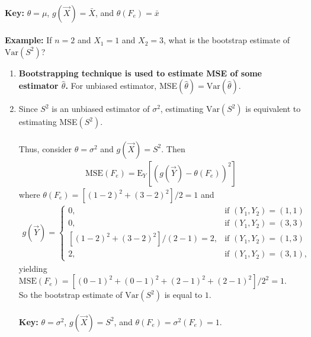 \documentclass[12pt]{article}
\begin{document}
\noindent\\
{\bf Key:} $\theta=\mu$,  $g({\vec X})={\bar X}$, and
$\theta(F_e)={\bar x}$ \noindent\\\\ {\bf Example:} If $n=2$ and
$X_1=1$ and $X_2=3$, what is the bootstrap estimate of
$\mbox{Var}(S^2)$?
\begin{enumerate}
\item {\bf Bootstrapping technique is used to estimate MSE of some
estimator ${\widehat \theta}$.} For unbiased estimator,
MSE$({\widehat \theta})=\mbox{Var}({\widehat \theta})$.

\item
Since $S^2$ is an unbiased estimator of $\sigma^2$, estimating
$\mbox{Var}(S^2)$ is equivalent to estimating MSE$(S^2)$. \\
\\
Thus, consider $\theta=\sigma^2$ and $g({\vec X})=S^2$. Then
\begin{eqnarray*}
\mbox{MSE}(F_e)=\mbox{E}_Y\!\!\left[(g({\vec
Y})-\theta(F_e))^2\right]
\end{eqnarray*}
where $\theta(F_e)=\left[(1-2)^2+(3-2)^2\right]/2=1$ and
\begin{eqnarray*}
g({\vec Y})=\left\{\begin{array}{ll} 0,
  & \mbox{if $(Y_1,Y_2)=(1,1)$}\\
   0,
  & \mbox{if $(Y_1,Y_2)=(3,3)$}\\
   \left[(1-2)^2+(3-2)^2\right]/(2-1)=2,
  & \mbox{if $(Y_1,Y_2)=(1,3)$}\\
   2,
  & \mbox{if $(Y_1,Y_2)=(3,1)$},
\end{array}\right.
\end{eqnarray*}
yielding
$\mbox{MSE}(F_e)=\left[(0-1)^2+(0-1)^2+(2-1)^2+(2-1)^2\right]/2^2=1$.
\\
So the bootstrap estimate of $\mbox{Var}(S^2)$  is equal to $1$.
\\\\
{\bf Key:} $\theta=\sigma^2$,  $g({\vec X})=S^2$, and
$\theta(F_e)=\sigma^2(F_e)=1$.
\end{enumerate}
\end{document}
